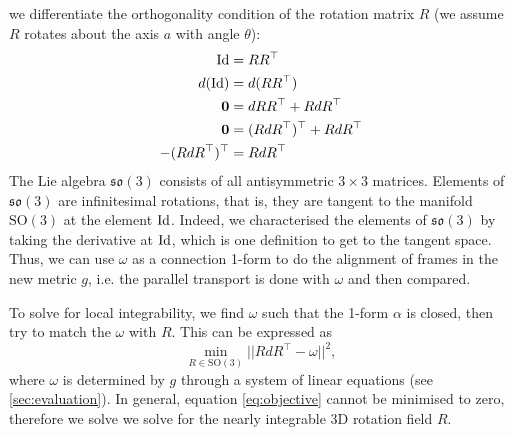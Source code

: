 \documentclass[../thesis.tex]{subfiles}
\begin{document}
we differentiate the orthogonality condition of the rotation matrix $R$ (we assume $R$ rotates about the axis $a$ with angle $\theta$):
\begin{align*}
  \operatorname{Id} &= RR^{\top} \\
  d(\operatorname{Id}) &= d(RR^{\top}) \\
  \bm{0} &= dRR^{\top} + RdR^{\top} \\
  \bm{0} &= (RdR^{\top})^{\top} + RdR^{\top} \\
  -(RdR^{\top})^{\top} &= RdR^{\top}
\end{align*}
The Lie algebra $\mathfrak{so}(3)$ consists of all antisymmetric $3\times3$ matrices.
Elements of $\mathfrak{so}(3)$ are infinitesimal rotations, that is,
they are tangent to the manifold $\mathrm{SO}(3)$ at the element $\operatorname{Id}$.
Indeed, we characterised the elements of $\mathfrak{so}(3)$ by taking the derivative at $\operatorname{Id}$,
which is one definition to get to the tangent space.
Thus, we can use $\omega$ as a connection 1-form to do the alignment of frames in
the new metric $g$, i.e. the parallel transport is done with $\omega$ and then compared.

To solve for local integrability, we find $\omega$ such that the 1-form $\alpha$ is closed,
then try to match the $\omega$ with $R$. This can be expressed as
\begin{equation}\label{eq:objective}
  \min_{R\in \mathrm{SO}(3)} ||RdR^{\top} - \omega ||^2,
\end{equation}
where $\omega$ is determined by $g$ through a system of linear equations (see \ref{sec:evaluation}).
In general, equation \ref{eq:objective} cannot be minimised to zero, therefore we solve we solve
for the nearly integrable 3D rotation field $R$.
\end{document}
